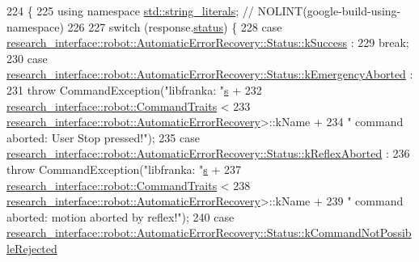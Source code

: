 \begin{DoxyCode}
224                                                                                  \{
225   \textcolor{keyword}{using namespace }\hyperlink{namespacestd_1_1string__literals}{std::string\_literals};  \textcolor{comment}{// NOLINT(google-build-using-namespace)}
226 
227   \textcolor{keywordflow}{switch} (response.\hyperlink{structresearch__interface_1_1robot_1_1ResponseBase_a99bb821172a0ac77338cd8e0acbe8a96}{status}) \{
228     \textcolor{keywordflow}{case} \hyperlink{structresearch__interface_1_1robot_1_1AutomaticErrorRecovery_a551f4dbc4e62d57b411344538b806adca8c632159fa131f09d04f94e3cbcd8782}{research\_interface::robot::AutomaticErrorRecovery::Status::kSuccess}
      :
229       \textcolor{keywordflow}{break};
230     \textcolor{keywordflow}{case} 
      \hyperlink{structresearch__interface_1_1robot_1_1AutomaticErrorRecovery_a551f4dbc4e62d57b411344538b806adca452811dc518f62ba40861befb68a20cf}{research\_interface::robot::AutomaticErrorRecovery::Status::kEmergencyAborted}
      :
231       \textcolor{keywordflow}{throw} CommandException(\textcolor{stringliteral}{"libfranka: "}\hyperlink{namespaceservice__node__3_aa976421a49e0b54f23833423400849ae}{s} +
232                              \hyperlink{structresearch__interface_1_1robot_1_1CommandTraits}{research\_interface::robot::CommandTraits}
      <
233                                  
      \hyperlink{structresearch__interface_1_1robot_1_1AutomaticErrorRecovery}{research\_interface::robot::AutomaticErrorRecovery}>::kName 
      +
234                              \textcolor{stringliteral}{" command aborted: User Stop pressed!"});
235     \textcolor{keywordflow}{case} 
      \hyperlink{structresearch__interface_1_1robot_1_1AutomaticErrorRecovery_a551f4dbc4e62d57b411344538b806adcaedb741f9f460686f7d799eb503d047f1}{research\_interface::robot::AutomaticErrorRecovery::Status::kReflexAborted}
      :
236       \textcolor{keywordflow}{throw} CommandException(\textcolor{stringliteral}{"libfranka: "}\hyperlink{namespaceservice__node__3_aa976421a49e0b54f23833423400849ae}{s} +
237                              \hyperlink{structresearch__interface_1_1robot_1_1CommandTraits}{research\_interface::robot::CommandTraits}
      <
238                                  
      \hyperlink{structresearch__interface_1_1robot_1_1AutomaticErrorRecovery}{research\_interface::robot::AutomaticErrorRecovery}>::kName 
      +
239                              \textcolor{stringliteral}{" command aborted: motion aborted by reflex!"});
240     \textcolor{keywordflow}{case} 
      \hyperlink{structresearch__interface_1_1robot_1_1AutomaticErrorRecovery_a551f4dbc4e62d57b411344538b806adca168d00b46403240019d0b42f5a116cdd}{research\_interface::robot::AutomaticErrorRecovery::Status::kCommandNotPossibleRejected}

\end{DoxyCode}
